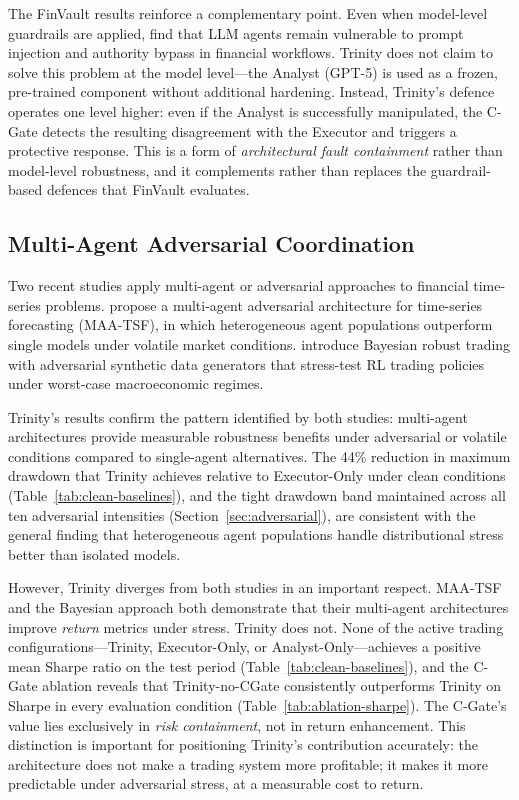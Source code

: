 The FinVault results reinforce a complementary point. Even when
model-level guardrails are applied, \cite{yang_finvault_2026} find that
LLM agents remain vulnerable to prompt injection and authority bypass in
financial workflows. Trinity does not claim to solve this problem at the
model level---the Analyst (GPT-5) is used as a frozen, pre-trained
component without additional hardening. Instead, Trinity's defence operates
one level higher: even if the Analyst is successfully manipulated, the
C-Gate detects the resulting disagreement with the Executor and triggers a
protective response. This is a form of \emph{architectural fault
containment} rather than model-level robustness, and it complements rather
than replaces the guardrail-based defences that FinVault evaluates.

\subsection{Multi-Agent Adversarial Coordination}
\label{sec:disc-multi-agent-adversarial}

Two recent studies apply multi-agent or adversarial approaches to financial
time-series problems. \cite{qiao_multi-agent_2025} propose a multi-agent
adversarial architecture for time-series forecasting (MAA-TSF), in which
heterogeneous agent populations outperform single models under volatile market
conditions. \cite{xia_bayesian_2026} introduce Bayesian robust trading with
adversarial synthetic data generators that stress-test RL trading policies
under worst-case macroeconomic regimes.

Trinity's results confirm the pattern identified by both studies: multi-agent
architectures provide measurable robustness benefits under adversarial or
volatile conditions compared to single-agent alternatives. The 44\% reduction
in maximum drawdown that Trinity achieves relative to Executor-Only under
clean conditions (Table~\ref{tab:clean-baselines}), and the tight drawdown
band maintained across all ten adversarial intensities
(Section~\ref{sec:adversarial}), are consistent with the general finding that
heterogeneous agent populations handle distributional stress better than
isolated models.

However, Trinity diverges from both studies in an important respect. MAA-TSF
and the Bayesian approach both demonstrate that their multi-agent architectures
improve \emph{return} metrics under stress. Trinity does not. None of the
active trading configurations---Trinity, Executor-Only, or Analyst-Only---achieves
a positive mean Sharpe ratio on the test period
(Table~\ref{tab:clean-baselines}), and the C-Gate ablation reveals that
Trinity-no-CGate consistently outperforms Trinity on Sharpe in every evaluation
condition (Table~\ref{tab:ablation-sharpe}). The C-Gate's value lies
exclusively in \emph{risk containment}, not in return enhancement. This
distinction is important for positioning Trinity's contribution accurately:
the architecture does not make a trading system more profitable; it makes it
more predictable under adversarial stress, at a measurable cost to return.

